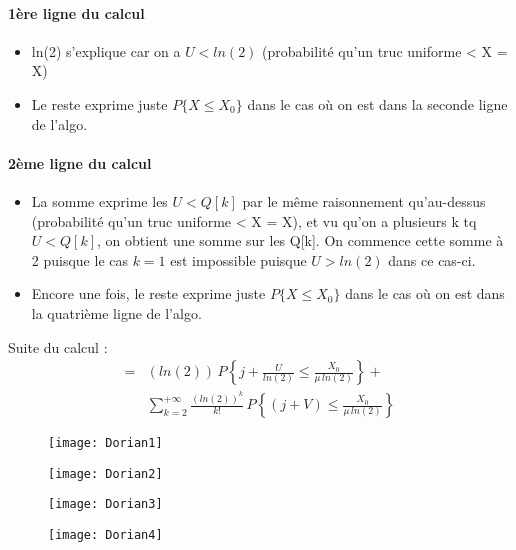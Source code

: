 \paragraph{1ère ligne du calcul}
\begin{itemize}
\item ln(2) s'explique car on a $U<ln(2)$ (probabilité qu'un truc uniforme < X = X)
\item Le reste exprime juste $P\{X \leq X_0\}$ dans le cas où on est dans la seconde ligne de l'algo.
\end{itemize}
\paragraph{2ème ligne du calcul}
\begin{itemize}
\item La somme exprime les $U<Q[k]$ par le même raisonnement qu'au-dessus (probabilité qu'un truc uniforme < X = X), et vu qu'on a plusieurs k tq $U<Q[k]$, on obtient une somme sur les Q[k]. On commence cette somme à 2 puisque le cas $k=1$ est impossible puisque $U > ln(2)$ dans ce cas-ci.
\item Encore une fois, le reste exprime juste $P\{X \leq X_0\}$ dans le cas où on est dans la quatrième ligne de l'algo.
\end{itemize}
\smallbreak
Suite du calcul : \\ 
\begin{equation}
\begin{split}
=& (ln(2))\,P\left\{j + \frac{U}{ln(2)} \leq \frac{X_0}{\mu\,ln(2)}\right\} +\\
	& \sum_{k=2}^{+\infty}\frac{(ln(2))^k}{k!}\,P\left\{(j + V) \leq \frac{X_0}{\mu\,ln(2)}\right\}
\end{split}
\end{equation}

\begin{figure}[H]
    \texttt{[image: Dorian1]}
\end{figure}
\begin{figure}[H]
    \texttt{[image: Dorian2]}
\end{figure}
\begin{figure}[H]
    \texttt{[image: Dorian3]}
\end{figure}
\begin{figure}[H]
    \texttt{[image: Dorian4]}
\end{figure}